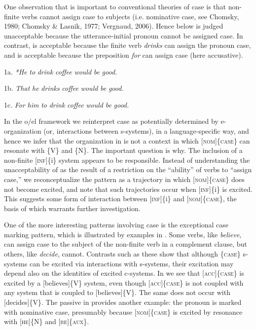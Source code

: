   One observation that is important to conventional theories of case is that non-finite verbs cannot assign case to subjects (i.e. nominative case, see Chomsky, 1980; Chomsky \& Lasnik, 1977; Vergnaud, 2006). Hence  below is judged unacceptable because the utterance-initial pronoun cannot be assigned case. In contrast,  is acceptable because the finite verb \textit{drinks} can assign the pronoun case, and  is acceptable because the preposition \textit{for} can assign case (here accusative).

  1a. \textit{*He} \textit{to} \textit{drink} \textit{coffee} \textit{would} \textit{be} \textit{good.}

  1b.  \textit{That} \textit{he} \textit{drinks} \textit{coffee} \textit{would} \textit{be} \textit{good.}

  1c.  \textit{For} \textit{him} \textit{to} \textit{drink} \textit{coffee} \textit{would} \textit{be} \textit{good.}

  In the o/el framework we reinterpret case as potentially determined by e-organization (or, interactions between s-systems), in a language-specific way, and hence we infer that the organization in  is not a context in which [\textsc{nom}]\{\textsc{case}\} can resonate with \{V\} and \{N\}. The important question is why. The inclusion of a non-finite [\textsc{inf}]\{i\} system appears to be responsible. Instead of understanding the unacceptability of  as the result of a restriction on the “ability” of verbs to “assign case,” we reconceptualize the pattern as a trajectory in which [\textsc{nom}]\{\textsc{case}\} does not become excited, and note that such trajectories occur when [\textsc{inf}]\{i\} is excited. This suggests some form of interaction between [\textsc{inf}]\{i\} and [\textsc{nom}]\{\textsc{case}\}, the basis of which warrants further investigation.

  One of the more interesting patterns involving case is the exceptional case marking pattern, which is illustrated by examples in . Some verbs, like \textit{believe}, can assign case to the subject of the non-finite verb in a complement clause, but others, like \textit{decide}, cannot. Contrasts such as these show that although \{\textsc{case}\} s-systems can be excited via interactions with s-systems, their excitation may depend also on the identities of excited c-systems. In  we see that \textsc{[acc]\{case\}} is excited by a [believes]\{V\} system, even though \textsc{[acc]\{case\}} is not coupled with any system that is coupled to [believes]\{V\}. The same does not occur with [decides]\{V\}. The passive in  provides another example: the pronoun is marked with nominative case, presumably because [\textsc{nom}]\{\textsc{case}\} is excited by resonance with [\textsc{he}]\{N\} and [\textsc{be}]\{\textsc{aux}\}.

